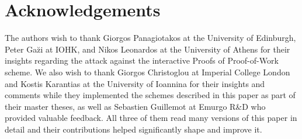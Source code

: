 \ifanonymous\else
\section*{Acknowledgements}
The authors wish to thank Giorgos Panagiotakos at the University of Edinburgh,
Peter Ga\u{z}i at IOHK, and Nikos Leonardos at the University of Athens for
their insights regarding the attack against the interactive Proofs of
Proof-of-Work scheme. We also wish to thank Giorgos Christoglou at Imperial
College London and Kostis Karantias at the University of Ioannina for their
insights and comments while they implemented the schemes described in this paper
as part of their master theses, as well as Sebastien Guillemot at Emurgo R\&D
who provided valuable feedback. All three of them read many versions of this
paper in detail and their contributions helped significantly shape and improve
it.
\fi
